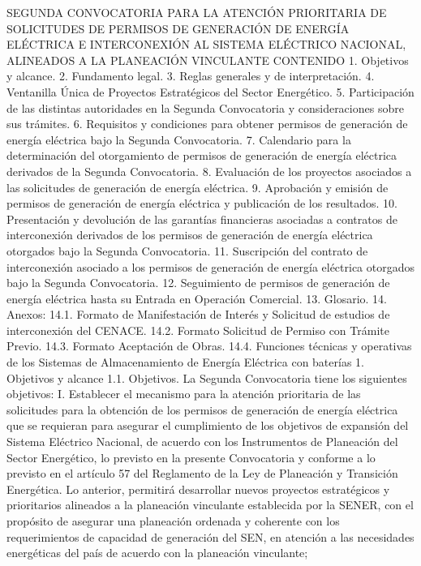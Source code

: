 SEGUNDA CONVOCATORIA PARA LA ATENCIÓN PRIORITARIA DE SOLICITUDES DE PERMISOS DE GENERACIÓN DE ENERGÍA ELÉCTRICA E INTERCONEXIÓN AL SISTEMA ELÉCTRICO NACIONAL, ALINEADOS A LA PLANEACIÓN VINCULANTE
CONTENIDO
1. Objetivos y alcance.
2. Fundamento legal.
3. Reglas generales y de interpretación.
4. Ventanilla Única de Proyectos Estratégicos del Sector Energético.
5. Participación de las distintas autoridades en la Segunda Convocatoria y consideraciones sobre sus trámites.
6. Requisitos y condiciones para obtener permisos de generación de energía eléctrica bajo la Segunda Convocatoria.
7. Calendario para la determinación del otorgamiento de permisos de generación de energía eléctrica derivados de la Segunda Convocatoria.
8. Evaluación de los proyectos asociados a las solicitudes de generación de energía eléctrica.
9. Aprobación y emisión de permisos de generación de energía eléctrica y publicación de los resultados.
10. Presentación y devolución de las garantías financieras asociadas a contratos de interconexión derivados de los permisos de generación de energía eléctrica otorgados bajo la Segunda Convocatoria.
11. Suscripción del contrato de interconexión asociado a los permisos de generación de energía eléctrica otorgados bajo la Segunda Convocatoria.
12. Seguimiento de permisos de generación de energía eléctrica hasta su Entrada en Operación Comercial.
13. Glosario.
14. Anexos:
14.1. Formato de Manifestación de Interés y Solicitud de estudios de interconexión del CENACE.
14.2. Formato Solicitud de Permiso con Trámite Previo.
14.3. Formato Aceptación de Obras.
14.4. Funciones técnicas y operativas de los Sistemas de Almacenamiento de Energía Eléctrica con baterías
1. Objetivos y alcance
1.1. Objetivos. La Segunda Convocatoria tiene los siguientes objetivos:
I. Establecer el mecanismo para la atención prioritaria de las solicitudes para la obtención de los permisos de generación de energía eléctrica que se requieran para asegurar el cumplimiento de los objetivos de expansión del Sistema Eléctrico Nacional, de acuerdo con los Instrumentos de Planeación del Sector Energético, lo previsto en la presente Convocatoria y conforme a lo previsto en el artículo 57 del Reglamento de la Ley de Planeación y Transición Energética.
Lo anterior, permitirá desarrollar nuevos proyectos estratégicos y prioritarios alineados a la planeación vinculante establecida por la SENER, con el propósito de asegurar una planeación ordenada y coherente con los requerimientos de capacidad de generación del SEN, en atención a las necesidades energéticas del país de acuerdo con la planeación vinculante;
